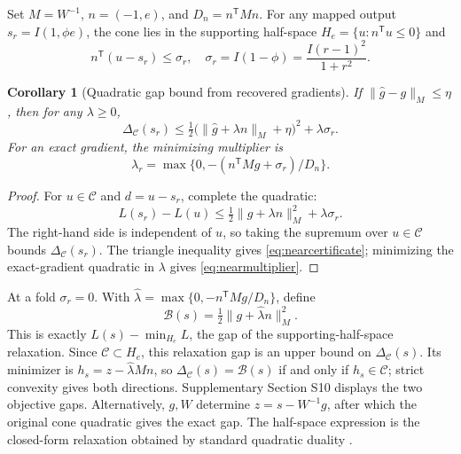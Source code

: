\documentclass[pdflatex,sn-mathphys-num]{sn-jnl}
\newtheorem{corollary}[theorem]{Corollary}
\begin{document}
Set $M=W^{-1}$, $n=(-1,e)$, and $D_n=n^{\mathsf T}Mn$. For any mapped output $s_r=I(1,\phi e)$, the cone lies in the supporting half-space $H_e=\{u:n^{\mathsf T}u\leq0\}$ and
\begin{equation}
 n^{\mathsf T}(u-s_r)\leq\sigma_r,\quad
 \sigma_r=I(1-\phi)=\frac{I(r-1)^2}{1+r^2}.
 \label{eq:supportslack}
\end{equation}
\begin{corollary}[Quadratic gap bound from recovered gradients]
\label{cor:gap}
If $\|\widehat g-g\|_M\leq\eta$, then for any $\lambda\geq0$,
\begin{equation}
 \Delta_{\mathcal C}(s_r)\leq
 \tfrac12\bigl(\|\widehat g+\lambda n\|_M+\eta\bigr)^2
 +\lambda\sigma_r.
 \label{eq:nearcertificate}
\end{equation}
For an exact gradient, the minimizing multiplier is
\begin{equation}
 \lambda_r=\max\{0,-(n^{\mathsf T}Mg+\sigma_r)/D_n\}.
 \label{eq:nearmultiplier}
\end{equation}
\end{corollary}
\begin{proof}
For $u\in\mathcal C$ and $d=u-s_r$, complete the quadratic:
\begin{equation*}
 L(s_r)-L(u)\leq\tfrac12\|g+\lambda n\|_M^2+\lambda\sigma_r.
\end{equation*}
The right-hand side is independent of $u$, so taking the supremum over $u\in\mathcal C$ bounds $\Delta_{\mathcal C}(s_r)$. The triangle inequality gives \eqref{eq:nearcertificate}; minimizing the exact-gradient quadratic in $\lambda$ gives \eqref{eq:nearmultiplier}.
\end{proof}
At a fold $\sigma_r=0$. With $\widehat\lambda=\max\{0,-n^{\mathsf T}Mg/D_n\}$, define
\begin{equation}
 \mathcal B(s)=\tfrac12\|g+\widehat\lambda n\|_M^2.
 \label{eq:residualcertificate}
\end{equation}
This is exactly $L(s)-\min_{H_e}L$, the gap of the supporting-half-space relaxation. Since $\mathcal C\subset H_e$, this relaxation gap is an upper bound on $\Delta_{\mathcal C}(s)$. Its minimizer is $h_s=z-\widehat\lambda Mn$, so $\Delta_{\mathcal C}(s)=\mathcal B(s)$ if and only if $h_s\in\mathcal C$; strict convexity gives both directions. Supplementary Section S10 displays the two objective gaps. Alternatively, $g,W$ determine $z=s-W^{-1}g$, after which the original cone quadratic gives the exact gap. The half-space expression is the closed-form relaxation obtained by standard quadratic duality \cite{cvxbook}.
\end{document}
